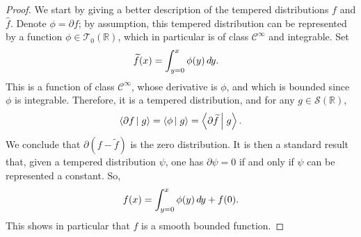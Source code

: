 \documentclass[envcountsame]{svmult}
\newcommand{\R}{\mathbb{R}}
\newcommand{\testf}{\mathscr{T}}
\newcommand{\schwartz}{\mathscr{S}}
\newcommand{\scal}[2]{\left\langle #1\vphantom{#2}\,\right |\left.#2 \vphantom{#1}\right\rangle}
\newcommand{\DD}[1]{\,d\hspace*{-0.3mm}{#1}}
\begin{document}
\begin{proof}
We start by giving a better description of the tempered distributions $f$ and $\widehat{f}$. Denote $\phi  = \partial f$; by assumption, this tempered distribution can be represented by a function $\phi \in \testf_0(\R)$, which in particular is of class $\mathscr{C}^\infty$ and integrable. Set
\begin{align*}
\widetilde{f}(x) &= \int_{y=0}^x \phi(y)\DD{y}.
\end{align*}
This is a function of class $\mathscr{C}^\infty$, whose derivative is $\phi$, and which is bounded since $\phi$ is integrable. Therefore, it is a tempered distribution, and for any $g\in \schwartz(\R)$,
$$\scal{\partial f}{g} = \scal{\phi}{g} = \scal{\partial\widetilde{f}}{g}.$$
We conclude that $\partial(f-\widetilde{f})$ is the zero distribution. It is then a standard result that, given a tempered distribution $\psi$, one has $\partial \psi = 0$ if and only if $\psi$ can be represented a constant. So, 
$$ f(x) = \int_{y=0}^x \phi(y)\DD{y} + f(0).$$ 
This shows in particular that $f$ is a smooth bounded function.
\medskip


\end{proof}
\end{document}
